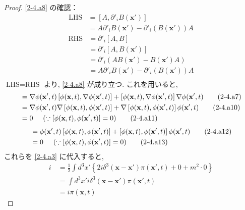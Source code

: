 \documentclass[a4paper,12pt]{article}
\begin{document}
\begin{proof}
\eqref{2-4.a8} の確認：
\begin{align*}
  \text{LHS} &= [A, \partial'_i B(\mathbf{x}')] \tag{2-4.a8}\\
  &= A \partial'_i B(\mathbf{x}') - \partial'_i (B(\mathbf{x}')) A \tag{2-4.a9}
\end{align*}
\begin{align*}
  \text{RHS} &= \partial'_i [A, B] \tag{2-4.a10}\\
  &= \partial'_i [A, B(\mathbf{x}')] \tag{2-4.a11}\\
  &= \partial'_i (A B(\mathbf{x}') - B(\mathbf{x}') A) \tag{2-4.a12}\\
  &= A \partial'_i B(\mathbf{x}') - \partial'_i (B(\mathbf{x}')) A \tag{2-4.a13}\\
\end{align*}
$\text{LHS} = \text{RHS}$ より, \eqref{2-4.a8} が成り立つ. これを用いると,
\begin{align*}
  [\phi(\mathbf{x}, t), (\nabla \phi(\mathbf{x}', t))^2] &= \nabla \phi(\mathbf{x}', t) \left[ \phi(\mathbf{x}, t), \nabla \phi(\mathbf{x}', t) \right] + \left[ \phi(\mathbf{x}, t), \nabla \phi(\mathbf{x}', t) \right] \nabla \phi(\mathbf{x}', t) \tag{2-4.a7}\\
  &= \nabla \phi(\mathbf{x}', t) \nabla \left[ \phi(\mathbf{x}, t), \phi(\mathbf{x}', t) \right] + \nabla \left[ \phi(\mathbf{x}, t), \phi(\mathbf{x}', t) \right] \phi(\mathbf{x}', t) \tag{2-4.a10}\\
  &= 0 \hspace{0.5cm} (\because [\phi(\mathbf{x}, t), \phi(\mathbf{x}', t)] = 0) \tag{2-4.a11}
\end{align*}
\begin{align*}
  [\phi(\mathbf{x}, t), \phi^2(\mathbf{x}', t)] &= \phi(\mathbf{x}', t) \left[ \phi(\mathbf{x}, t), \phi(\mathbf{x}', t) \right] + \left[ \phi(\mathbf{x}, t), \phi(\mathbf{x}', t) \right] \phi(\mathbf{x}', t) \tag{2-4.a12}\\
  &= 0 \hspace{0.5cm} (\because [\phi(\mathbf{x}, t), \phi(\mathbf{x}', t)] = 0) \tag{2-4.a13}
\end{align*}
これらを \eqref{2-4.a3} に代入すると,
\begin{align*}
  i\frac{}{} &= \frac{1}{2}\int d^3 x' \left\{ 2i \delta^3(\mathbf{x} - \mathbf{x}') \pi(\mathbf{x}', t) + 0 + m^2 \cdot 0 \right\} \tag{2-4.a14}\\
  &= \int d^3 x' i \delta^3(\mathbf{x} - \mathbf{x}') \pi(\mathbf{x}', t) \tag{2-4.a15}\\
  &= i \pi(\mathbf{x}, t) \tag{2-4.a16}
\end{align*}
\end{proof}
\end{document}
